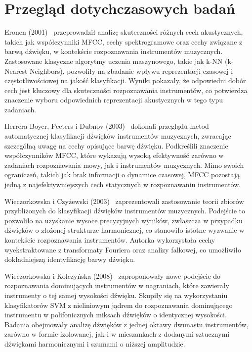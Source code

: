 \documentclass{SGGW-thesis}
\begin{document}
\section{Przegląd dotychczasowych badań}
Eronen (2001)~\cite{eronen2001automatic} przeprowadził analizę skuteczności różnych cech akustycznych, takich jak współczynniki MFCC, cechy spektrogramowe oraz cechy związane z barwą dźwięku, w kontekście rozpoznawania instrumentów muzycznych. Zastosowane klasyczne algorytmy uczenia maszynowego, takie jak k-NN (k-Nearest Neighbors), pozwoliły na zbadanie wpływu reprezentacji czasowej i częstotliwościowej na jakość klasyfikacji. Wyniki pokazały, że odpowiedni dobór cech jest kluczowy dla skuteczności rozpoznawania instrumentów, co potwierdza znaczenie wyboru odpowiednich reprezentacji akustycznych w tego typu zadaniach.

Herrera-Boyer, Peeters i Dubnov (2003)~\cite{herrera2003automatic} dokonali przeglądu metod automatycznej klasyfikacji dźwięków instrumentów muzycznych, zwracając szczególną uwagę na cechy opisujące barwę dźwięku. Podkreślili znaczenie współczynników MFCC, które wykazują wysoką efektywność zarówno w zadaniach rozpoznawania mowy, jak i instrumentów muzycznych. Mimo swoich ograniczeń, takich jak brak informacji o dynamice czasowej, MFCC pozostają jedną z najefektywniejszych cech statycznych w rozpoznawaniu instrumentów.

Wieczorkowska i Czyżewski (2003)~\cite{wieczorkowska2003rough} zaprezentowali zastosowanie teorii zbiorów przybliżonych do klasyfikacji dźwięków instrumentów muzycznych. Podejście to pozwoliło na uzyskanie wysoce precyzyjnych wyników, zwłaszcza w przypadku dźwięków o złożonej strukturze harmonicznej, co stanowiło istotne wyzwanie w kontekście rozpoznawania instrumentów. Autorka wykorzystała cechy wyekstraktowane z transformaty Fouriera oraz analizy falkowej, co umożliwiło dokładniejszą identyfikację barwy dźwięku.

Wieczorkowska i Kolczyńska (2008)~\cite{wieczorkowska2008identification} zaproponowały nowe podejście do rozpoznawania dominujących instrumentów w nagraniach, które zawierały instrumenty o tej samej wysokości dźwięku. Skupiły się na wykorzystaniu klasyfikatorów SVM z nieliniowym jądrem do rozpoznawania dominującego instrumentu w polifonicznych miksach dźwięków o identycznej wysokości. Badania obejmowały analizę dźwięków z jednej oktawy dwunastu instrumentów, zarówno w formie izolowanej, jak i w mieszankach z dodanymi sztucznymi dźwiękami harmonicznymi i szumami o niższej amplitudzie.
\end{document}
